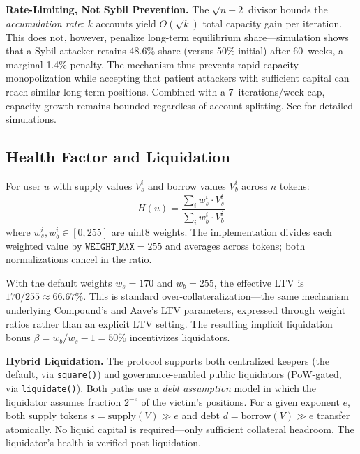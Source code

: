 \documentclass[10pt,a4paper,twocolumn]{article}
\begin{document}
\textbf{Rate-Limiting, Not Sybil Prevention.} The $\sqrt{n{+}2}$ divisor bounds the \emph{accumulation rate}: $k$ accounts yield $O(\sqrt{k})$ total capacity gain per iteration. This does not, however, penalize long-term equilibrium share---simulation shows that a Sybil attacker retains 48.6\% share (versus 50\% initial) after 60~weeks, a marginal 1.4\% penalty. The mechanism thus prevents rapid capacity monopolization while accepting that patient attackers with sufficient capital can reach similar long-term positions. Combined with a 7~iterations/week cap, capacity growth remains bounded regardless of account splitting. See \cite{sim} for detailed simulations.

\subsection{Health Factor and Liquidation}
\label{subsec:health-liquidation}

\begin{definition}
\label{def:health}
For user $u$ with supply values $V_s^i$ and borrow values $V_b^i$ across $n$ tokens:
\begin{equation}
\label{eq:health}
H(u) = \frac{\sum_i w_s^i \cdot V_s^i}{\sum_i w_b^i \cdot V_b^i}
\end{equation}
where $w_s^i, w_b^i \in [0, 255]$ are uint8 weights. The implementation divides each weighted value by $\texttt{WEIGHT\_MAX} = 255$ and averages across tokens; both normalizations cancel in the ratio.
\end{definition}

With the default weights $w_s = 170$ and $w_b = 255$, the effective LTV is $170/255 \approx 66.67\%$. This is standard over-collateralization---the same mechanism underlying Compound's and Aave's LTV parameters, expressed through weight ratios rather than an explicit LTV setting. The resulting implicit liquidation bonus $\beta = w_b/w_s - 1 = 50\%$ incentivizes liquidators.

\textbf{Hybrid Liquidation.} The protocol supports both centralized keepers (the default, via \texttt{square()}) and governance-enabled public liquidators (PoW-gated, via \texttt{liquidate()}). Both paths use a \emph{debt assumption} model in which the liquidator assumes fraction $2^{-e}$ of the victim's positions. For a given exponent $e$, both supply tokens $s = \text{supply}(V) \gg e$ and debt $d = \text{borrow}(V) \gg e$ transfer atomically. No liquid capital is required---only sufficient collateral headroom. The liquidator's health is verified post-liquidation.
\end{document}

